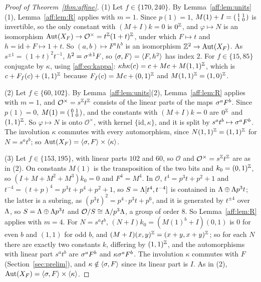 \begin{proof}[Proof of Theorem~\ref{thm:affine}]
(1) Let $f\in\{170,240\}$. By Lemma~\ref{aff:lem:units}(1), Lemma~\ref{aff:lem:R} applies with $m=1$. Since $p(1)=1$, $M(1)+I=\begin{psmallmatrix}1&1\\1&0\end{psmallmatrix}$ is invertible, so the only constant with $(M+I)k=0$ is $0^{\mathbb{Z}}$, and $\varphi\mapsto N$ is an isomorphism $\operatorname{Aut}(X_F)\to\mathcal O^{\times}=t^{\mathbb{Z}}(1+t)^{\mathbb{Z}}$, under which $F\mapsto t$ and $h=\mathrm{id}+F\mapsto1+t$. So $(a,b)\mapsto F^ah^b$ is an isomorphism $\mathbb{Z}^2\to\operatorname{Aut}(X_F)$. As $s^{\pm1}=(1+t)^2t^{-1}$, $h^2=\sigma^{\pm1}F$, so $\langle\sigma,F\rangle=\langle F,h^2\rangle$ has index $2$. For $f\in\{15,85\}$ conjugate by $\kappa$, using \eqref{aff:eq:kappa}: $\kappa h\kappa(c)=c+Mc+M(1,1)^{\mathbb{Z}}$, which is $c+F_f(c)+(1,1)^{\mathbb{Z}}$ because $F_f(c)=Mc+(0,1)^{\mathbb{Z}}$ and $M(1,1)^{\mathbb{Z}}=(1,0)^{\mathbb{Z}}$.

(2) Let $f\in\{60,102\}$. By Lemma~\ref{aff:lem:units}(2), Lemma~\ref{aff:lem:R} applies with $m=1$, and $\mathcal O^{\times}=s^{\mathbb{Z}}t^{\mathbb{Z}}$ consists of the linear parts of the maps $\sigma^aF^b$. Since $p(1)=0$, $M(1)=\begin{psmallmatrix}0&1\\1&0\end{psmallmatrix}$, and the constants with $(M+I)k=0$ are $0^{\mathbb{Z}}$ and $(1,1)^{\mathbb{Z}}$. So $\varphi\mapsto N$ is onto $\mathcal O^\times$, with kernel $\{\mathrm{id},\kappa\}$, and it is split by $s^at^b\mapsto\sigma^aF^b$. The involution $\kappa$ commutes with every automorphism, since $N(1,1)^{\mathbb{Z}}=(1,1)^{\mathbb{Z}}$ for $N=s^at^b$; so $\operatorname{Aut}(X_F)=\langle\sigma,F\rangle\times\langle\kappa\rangle$.

(3) Let $f\in\{153,195\}$, with linear parts $102$ and $60$, so $\mathcal O$ and $\mathcal O^{\times}=s^{\mathbb{Z}}t^{\mathbb{Z}}$ are as in (2). On constants $M(1)$ is the transposition of the two bits and $k_0=(0,1)^{\mathbb{Z}}$, so $(I+M+M^2+M^3)k_0=0$ and $F^4=M^4$. In $\mathcal O$, $t^4=p^3t+p^2+1$ and $t^{-4}=(t+p)^4=p^3t+p^4+p^2+1$, so $S=\Lambda[t^{4},t^{-4}]$ is contained in $\Lambda\oplus\Lambda p^3t$; the latter is a subring, as $(p^3t)^2=p^4\cdot p^3t+p^6$, and it is generated by $t^{\pm4}$ over $\Lambda$, so $S=\Lambda\oplus\Lambda p^3t$ and $\mathcal O/S\cong\Lambda/p^3\Lambda$, a group of order $8$. So Lemma~\ref{aff:lem:R} applies with $m=4$. For $N=s^at^b$, $(N+I)k_0=(M(1)^b+I)(0,1)$ is $0$ for even $b$ and $(1,1)$ for odd $b$, and $(M+I)(x,y)^{\mathbb{Z}}=(x+y,x+y)^{\mathbb{Z}}$; so for each $N$ there are exactly two constants $k$, differing by $(1,1)^{\mathbb{Z}}$, and the automorphisms with linear part $s^at^b$ are $\sigma^aF^b$ and $\kappa\sigma^aF^b$. The involution $\kappa$ commutes with $F$ (Section~\ref{sec:prelim}), and $\kappa\notin\langle\sigma,F\rangle$ since its linear part is $I$. As in (2), $\operatorname{Aut}(X_F)=\langle\sigma,F\rangle\times\langle\kappa\rangle$.


\end{proof}
